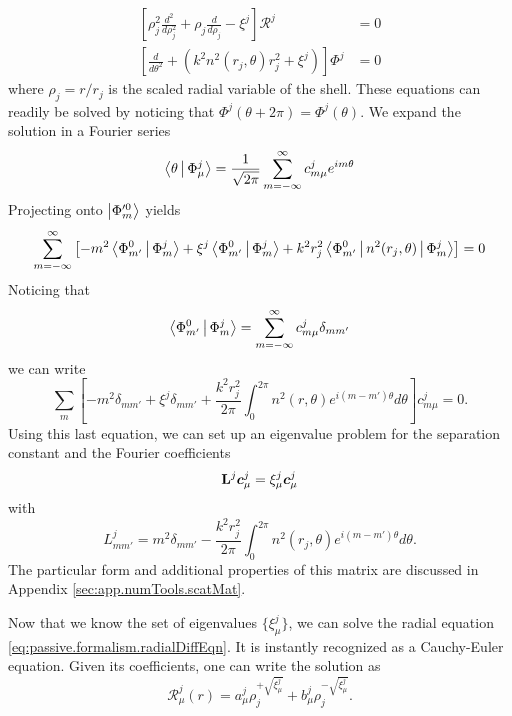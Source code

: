   \begin{subequations}
  \begin{align}
   \left[\rho_j^2\frac{d^2}{d\rho_j^2}+\rho_j\frac{d}{d\rho_j}-\xi^j\right]\mathcal{R}^j	&=0	\label{eq:passive.formalism.radialDiffEqn}	\\
   \left[\frac{d}{d\theta^2}+\left(k^2n^2(r_j,\theta)r_j^2+\xi^j\right)\right]\Phi^j		&=0
  \end{align}
  \end{subequations}
where $\rho_j=r/r_j$ is the scaled radial variable of the shell. 
These equations can readily be solved by noticing that
$\Phi^j(\theta+2\pi)=\Phi^j(\theta)$. We expand the solution
in a Fourier series
  \begin{equation}
   \Braket{\theta|\Phi_\mu^j} = \frac{1}{\sqrt{2\pi}}\sum_{m=-\infty}^\infty c_{m\mu}^je^{im\theta}
  \end{equation}
Projecting onto $\Ket{\Phi_m'^0}$ yields
\begin{equation}
    \sum_{m=-\infty}^\infty\left[-m^2\Braket{\Phi_{m'}^0|\Phi_m^j}+\xi^j\Braket{\Phi_{m'}^0|\Phi_m^j}+k^2r_j^2\Braket{\Phi_{m'}^0|n^2(r_j,\theta)|\Phi_m^j}\right]=0
  \end{equation}
Noticing that 
  \begin{equation}
    \Braket{\Phi_{m'}^0|\Phi_{m}^j} = \sum_{m=-\infty}^\infty c_{m\mu}^j \delta_{mm'}
  \end{equation}
we can write
  \begin{equation}
    \sum_m\left[-m^2\delta_{mm'}+\xi^j\delta_{mm'} + \frac{k^2r_j^2}{2\pi}\int_{0}^{2\pi}n^2(r,\theta)e^{i(m-m')\theta}d\theta\right]c_{m\mu}^j =0.
  \end{equation}
Using this last equation, we can set up an eigenvalue 
problem for the separation constant and the Fourier coefficients
  \begin{equation}
   \label{eq:passive.numerical.eigenvalue}
   \mathbf{L}^j\boldsymbol{c}_\mu^j=\xi_\mu^j\boldsymbol{c}_\mu^j
  \end{equation}
with
  \begin{equation}
    L_{mm'}^j = m^2\delta_{mm'}-\frac{k^2r_j^2}{2\pi}\int_0^{2\pi}n^2(r_j,\theta)e^{i(m-m')\theta}d\theta.
  \end{equation}
The particular form and additional properties of this matrix are discussed in 
Appendix \ref{sec:app.numTools.scatMat}.

Now that we know the set of eigenvalues $\{\xi_\mu^j\}$, we can solve the radial
equation \eqref{eq:passive.formalism.radialDiffEqn}. It is instantly recognized as 
a Cauchy-Euler equation. Given its coefficients, one can write the solution 
as \cite[p.~118-119]{GRE98}
  \begin{equation}
    \label{eq:sMatrix.radialSolution}
    \mathcal{R}_\mu^j(r) =  a_\mu^j\rho_j^{+\sqrt{\xi_\mu^j}}+b_\mu^j\rho_j^{-\sqrt{\xi_\mu^j}}.
  \end{equation}
  
